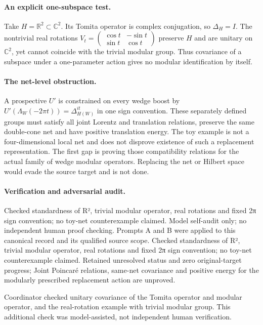 \documentclass[11pt]{article}
\begin{document}
\paragraph{An explicit one-subspace test.} Take $H=\mathbb R^2\subset\mathbb C^2$. Its Tomita operator is complex conjugation, so $\Delta_H=I$. The nontrivial real rotations $V_t=\left(\begin{smallmatrix}\cos t&-\sin t\\\sin t&\cos t\end{smallmatrix}\right)$ preserve $H$ and are unitary on $\mathbb C^2$, yet cannot coincide with the trivial modular group. Thus covariance of a subspace under a one-parameter action gives no modular identification by itself.

\paragraph{The net-level obstruction.} A prospective $U'$ is constrained on every wedge boost by $U'(\Lambda_W(-2\pi t))=\Delta_{H(W)}^{it}$ in one sign convention. These separately defined groups must satisfy all joint Lorentz and translation relations, preserve the same double-cone net and have positive translation energy. The toy example is not a four-dimensional local net and does not disprove existence of such a replacement representation. The first gap is proving those compatibility relations for the actual family of wedge modular operators. Replacing the net or Hilbert space would evade the source target and is not done.

\paragraph{Verification and adversarial audit.}
Checked standardness of R², trivial modular operator, real rotations and fixed 2π sign convention; no toy-net counterexample claimed. Model self-audit only; no independent human proof checking. Prompts A and B were applied to this canonical record and its qualified source scope. Checked standardness of R², trivial modular operator, real rotations and fixed 2π sign convention; no toy-net counterexample claimed. Retained unresolved status and zero original-target progress; Joint Poincaré relations, same-net covariance and positive energy for the modularly prescribed replacement action are unproved.

Coordinator checked unitary covariance of the Tomita operator and modular operator, and the real-rotation example with trivial modular group. This additional check was model-assisted, not independent human verification.
\end{document}

